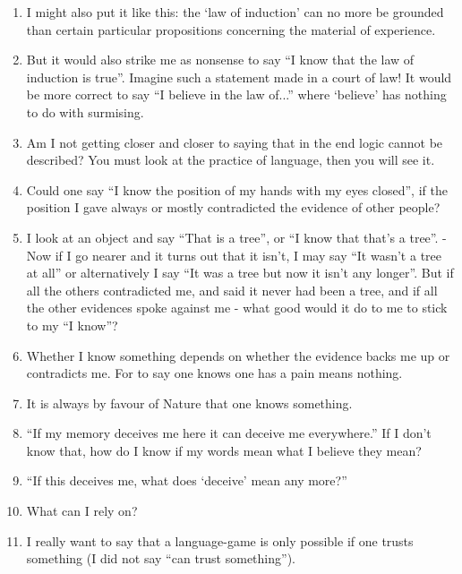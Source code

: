 \documentclass{book}
\begin{document}
\begin{enumerate}
\item
I might also put it like this: the `law of induction' can no more be grounded
than certain particular propositions concerning the material of experience.

\item
But it would also strike me as nonsense to say ``I know that the law of
induction is true''.  Imagine such a statement made in a court of law! It would
be more correct to say ``I believe in the law of...'' where `believe' has
nothing to do with surmising.

\item
Am I not getting closer and closer to saying that in the end logic cannot be
described? You must look at the practice of language, then you will see it.

\item
Could one say ``I know the position of my hands with my eyes closed'', if the
position I gave always or mostly contradicted the evidence of other people?

\item
I look at an object and say ``That is a tree'', or ``I know that that's a
tree''. - Now if I go nearer and it turns out that it isn't, I may say ``It
wasn't a tree at all'' or alternatively I say ``It was a tree but now it isn't
any longer''. But if all the others contradicted me, and said it never had been
a tree, and if all the other evidences spoke against me - what good would it do
to me to stick to my ``I know''?

\item
Whether I know something depends on whether the evidence backs me up or
contradicts me. For to say one knows one has a pain means nothing.

\item
It is always by favour of Nature that one knows something.

\item
``If my memory deceives me here it can deceive me everywhere.'' If I don't know
that, how do I know if my words mean what I believe they mean?

\item
``If this deceives me, what does `deceive' mean any more?''

\item
What can I rely on?

\item
I really want to say that a language-game is only possible if one trusts
something (I did not say ``can trust something'').


\end{enumerate}
\end{document}
